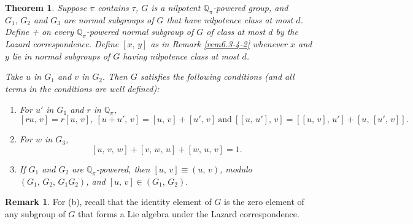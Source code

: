 \documentclass[mathscr]{amsart}
\theoremstyle{theorem}
\newtheorem{theorem}{Theorem}[section]
\theoremstyle{definition}
\newtheorem*{remarknn}{Remark}
\numberwithin{equation}{section}
\def\[{\left[}
\def\]{\right]}
\def\Q{\mathbb{Q}}
\begin{document}
\begin{theorem}\label{theo6.4-4-2}
Suppose $\pi$ contains $\tau$, $G$ is a nilpotent $\Q_\pi$-powered
group, and $G_1,\,G_2$ and $G_3$ are normal subgroups of $G$ that
have nilpotence class at most $d$. Define + on every
$\Q_\pi$-powered normal subgroup of $G$ of class at most $d$ by the
Lazard correspondence. Define $[x,\,y]$ as in Remark
\ref{rem6.3-4-2} whenever $x$ and $y$ lie in normal subgroups of $G$
having nilpotence class at most $d$.

Take $u$ in $G_1$ and $v$ in $G_2$. Then $G$ satisfies the following
conditions (and all terms in the conditions are well defined):

\begin{enumerate}
\item[(a)] For $u'$ in $G_1$ and $r$ in $\Q_\pi$,
$$[ru,\,v]=r[u,\,v],\ [u+u',\,v]=[u,\,v]+[u',\,v]\ \text{and}\ \[[u,\,u'],\,v\]=\[[u,\,v],\,u'\]+\[u,\,[u',\,v]\].$$
\item[(b)] For $w$ in $G_3$,
$$[u,\,v,\,w]+[v,\,w,\,u]+[w,\,u,\,v]=1.$$
\item[(c)] If $G_1$ and $G_2$ are $\Q_\pi$-powered, then
$[u,\,v]\equiv(u,\,v)$, modulo $(G_1,\,G_2,\,G_1G_2)$, and
$[u,\,v]\in(G_1,\,G_2).$
\end{enumerate}
\end{theorem}

\begin{remarknn}
For (b), recall that the identity element of $G$ is the zero element
of any subgroup of $G$ that forms a Lie algebra under the Lazard
correspondence.
\end{remarknn}
\end{document}
